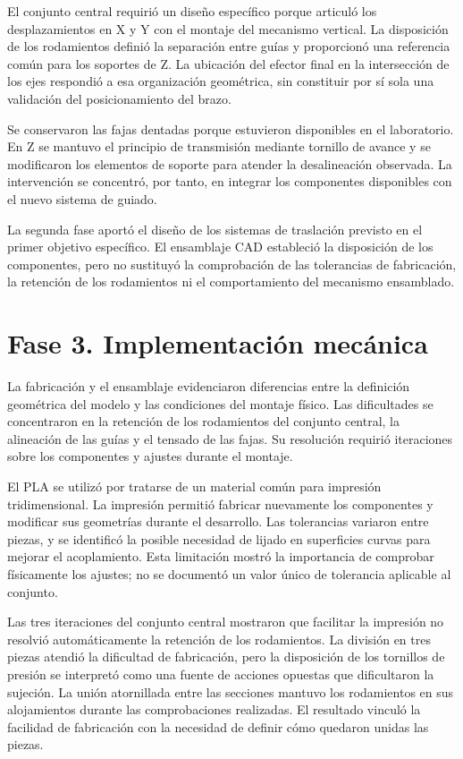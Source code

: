 El conjunto central requirió un diseño específico porque articuló los desplazamientos en X y Y con el montaje del mecanismo vertical. La disposición de los rodamientos definió la separación entre guías y proporcionó una referencia común para los soportes de Z. La ubicación del efector final en la intersección de los ejes respondió a esa organización geométrica, sin constituir por sí sola una validación del posicionamiento del brazo.

Se conservaron las fajas dentadas porque estuvieron disponibles en el laboratorio. En Z se mantuvo el principio de transmisión mediante tornillo de avance y se modificaron los elementos de soporte para atender la desalineación observada. La intervención se concentró, por tanto, en integrar los componentes disponibles con el nuevo sistema de guiado.

La segunda fase aportó el diseño de los sistemas de traslación previsto en el primer objetivo específico. El ensamblaje CAD estableció la disposición de los componentes, pero no sustituyó la comprobación de las tolerancias de fabricación, la retención de los rodamientos ni el comportamiento del mecanismo ensamblado.

\section{Fase 3. Implementación mecánica}
\label{sec:discusion_fase3}

La fabricación y el ensamblaje evidenciaron diferencias entre la definición geométrica del modelo y las condiciones del montaje físico. Las dificultades se concentraron en la retención de los rodamientos del conjunto central, la alineación de las guías y el tensado de las fajas. Su resolución requirió iteraciones sobre los componentes y ajustes durante el montaje.

El PLA se utilizó por tratarse de un material común para impresión tridimensional. La impresión permitió fabricar nuevamente los componentes y modificar sus geometrías durante el desarrollo. Las tolerancias variaron entre piezas, y se identificó la posible necesidad de lijado en superficies curvas para mejorar el acoplamiento. Esta limitación mostró la importancia de comprobar físicamente los ajustes; no se documentó un valor único de tolerancia aplicable al conjunto.

Las tres iteraciones del conjunto central mostraron que facilitar la impresión no resolvió automáticamente la retención de los rodamientos. La división en tres piezas atendió la dificultad de fabricación, pero la disposición de los tornillos de presión se interpretó como una fuente de acciones opuestas que dificultaron la sujeción. La unión atornillada entre las secciones mantuvo los rodamientos en sus alojamientos durante las comprobaciones realizadas. El resultado vinculó la facilidad de fabricación con la necesidad de definir cómo quedaron unidas las piezas.

